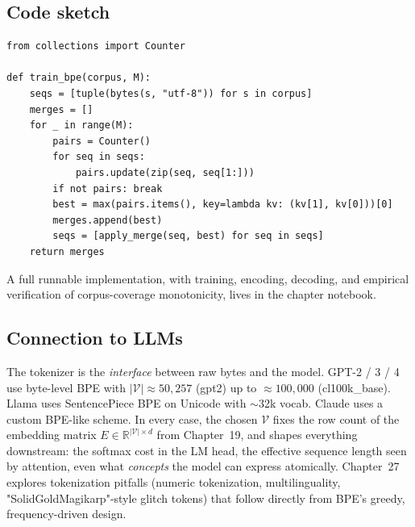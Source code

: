\subsection*{Code sketch}

\begin{verbatim}
from collections import Counter

def train_bpe(corpus, M):
    seqs = [tuple(bytes(s, "utf-8")) for s in corpus]
    merges = []
    for _ in range(M):
        pairs = Counter()
        for seq in seqs:
            pairs.update(zip(seq, seq[1:]))
        if not pairs: break
        best = max(pairs.items(), key=lambda kv: (kv[1], kv[0]))[0]
        merges.append(best)
        seqs = [apply_merge(seq, best) for seq in seqs]
    return merges
\end{verbatim}

A full runnable implementation, with training, encoding, decoding, and empirical verification of corpus-coverage monotonicity, lives in the chapter notebook.

\subsection*{Connection to LLMs}

The tokenizer is the \emph{interface} between raw bytes and the model. GPT-2 / 3 / 4 use byte-level BPE with $|\mathcal{V}| \approx 50{,}257$ (gpt2) up to $\approx 100{,}000$ (cl100k\_base). Llama uses SentencePiece BPE on Unicode with $\sim$32k vocab. Claude uses a custom BPE-like scheme. In every case, the chosen $\mathcal{V}$ fixes the row count of the embedding matrix $E \in \mathbb{R}^{|\mathcal{V}| \times d}$ from Chapter~19, and shapes everything downstream: the softmax cost in the LM head, the effective sequence length seen by attention, even what \emph{concepts} the model can express atomically. Chapter~27 explores tokenization pitfalls (numeric tokenization, multilinguality, "SolidGoldMagikarp"-style glitch tokens) that follow directly from BPE's greedy, frequency-driven design.
